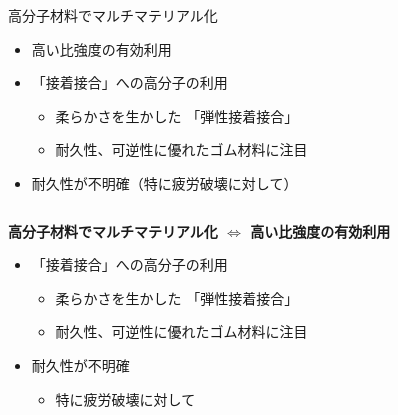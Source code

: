 \begin{columns}[totalwidth=.9\linewidth]
    \column{\textwidth}
        \begin{itembox}[c]{高分子材料でマルチマテリアル化}
            \begin{itemize}
                \item 高い比強度の有効利用
                \item {\color{red} 「接着接合」}への高分子の利用
                    \begin{itemize}
                        \item 柔らかさを生かした{\color{red} 「弾性接着接合」}
                        \item 耐久性、可逆性に優れた\alert{ゴム材料に注目}
                    \end{itemize}
                \item {\color{blue}耐久性が不明確（特に疲労破壊に対して）}
            \end{itemize}
        \end{itembox}
\end{columns}

\begin{columns}[totalwidth=.9\linewidth]
    \column{\textwidth}
        \begin{boxnote}
            \textbf{高分子材料でマルチマテリアル化 $\Leftrightarrow$ 高い比強度の有効利用}
            \begin{itemize}
                \item {\color{red} 「接着接合」}への高分子の利用
                    \begin{itemize}
                        \item 柔らかさを生かした{\color{red} 「弾性接着接合」}
                        \item 耐久性、可逆性に優れた\alert{ゴム材料に注目}
                    \end{itemize}
                \item {\color{blue}耐久性が不明確}
                    \begin{itemize}
                        \item 特に疲労破壊に対して
                    \end{itemize}
            \end{itemize}
        \end{boxnote}
\end{columns}

